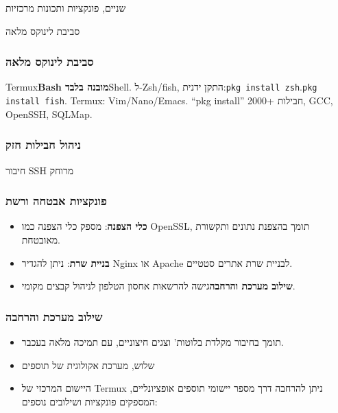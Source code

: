 


שניים, פונקציות ותכונות מרכזיות

סביבת לינוקס מלאה


\subsubsection*{סביבת לינוקס מלאה}

Termux\textbf{Bash מובנה בלבד}Shell. ל-Zsh/fish, התקן ידנית:\texttt{pkg install zsh}.\texttt{pkg install fish}. Termux: Vim/Nano/Emacs. “pkg install” 2000+ חבילות, GCC, OpenSSH, SQLMap.

\subsubsection*{ניהול חבילות חזק}

חיבור SSH מרוחק

\subsubsection*{פונקציות אבטחה ורשת}

\begin{itemize}
  \item \textbf{כלי הצפנה}: מספק כלי הצפנה כמו OpenSSL, תומך בהצפנת נתונים ותקשורת מאובטחת.
  \item \textbf{בניית שרת}: ניתן להגדיר Nginx או Apache לבניית שרת אתרים סטטיים.
  \item \textbf{שילוב מערכת והרחבה}גישה להרשאות אחסון הטלפון לניהול קבצים מקומי.
\end{itemize}

\subsubsection*{שילוב מערכת והרחבה}

\begin{itemize}
  \item תומך בחיבור מקלדת בלוטות' וצגים חיצוניים, עם תמיכה מלאה בעכבר.
  \item שלוש, מערכת אקולוגית של תוספים
  \item היישום המרכזי של Termux ניתן להרחבה דרך מספר יישומי תוספים אופציונליים, המספקים פונקציות ושילובים נוספים:
\end{itemize}


